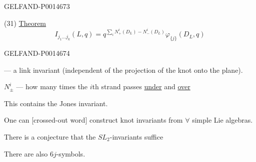 \begin{GelfandAdjacentEvidence}{GELFAND-P001467}{3}


(31) \underline{Theorem}
\[
I_{j_1\ldots j_k}(L,q)=q^{\sum_i N_+^i(D_L)-N_-^i(D_L)}\varphi_{\{j\}}(D_L,q)
\]
\end{GelfandAdjacentEvidence}
\begin{GelfandAdjacentEvidence}{GELFAND-P001467}{4}


--- a link invariant (independent of the projection of the knot onto the plane).

\(N_\pm^i\) --- how many times the \(i\)th strand passes \underline{under} and \underline{over}

This contains the Jones invariant.

One can [crossed-out word] construct knot invariants from \(\forall\) simple Lie algebras.
\end{GelfandAdjacentEvidence}


There is a conjecture that the \(SL_2\)-invariants suffice

There are also \(6j\)-symbols.


